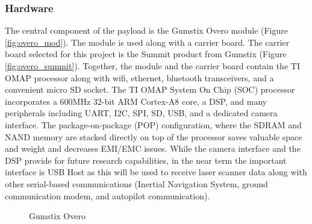 \documentclass[a4paper,11pt]{report}
\begin{document}
\subsubsection{Hardware}

The central component of the payload is the Gumstix Overo module (Figure \ref{fig:overo_mod}). The module is used along with a carrier board. The carrier board selected for this project is the Summit product from Gumstix (Figure \ref{fig:overo_summit}). Together, the module and the carrier board contain the TI OMAP processor along with wifi, ethernet, bluetooth transceivers, and a convenient micro SD socket. The TI OMAP System On Chip (SOC) processor incorporates a 600MHz 32-bit ARM Cortex-A8 core, a DSP, and many peripherals including UART, I2C, SPI, SD, USB, and a dedicated camera interface. The package-on-package (POP) configuration, where the SDRAM and NAND memory are stacked directly on top of the processor saves valuable space and weight and decreases EMI/EMC issues. While the camera interface and the DSP provide for future research capabilities, in the near term the important interface is USB Host as this will be used to receive laser scanner data along with other serial-based communications (Inertial Navigation System, ground communication modem, and autopilot communication).

\begin{figure}[htb]
  \centering
  \caption{Gumstix Overo}
  \label{fig:overo}
\end{figure}
\end{document}
